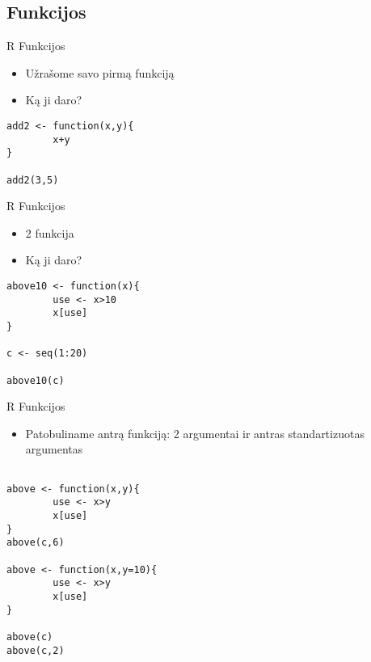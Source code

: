 \documentclass[11pt,xcolor=table]{beamer}
\begin{document}
\subsection{Funkcijos}

\begin{frame}[fragile]{R Funkcijos}
\begin{itemize}
\item Užrašome savo pirmą funkciją
\item Ką ji daro?
\end{itemize}
\begin{lstlisting}
add2 <- function(x,y){
        x+y
}

add2(3,5)
\end{lstlisting}
\end{frame}

\begin{frame}[fragile]{R Funkcijos}
\begin{itemize}
\item 2 funkcija
\item Ką ji daro?
\end{itemize}
\begin{lstlisting}
above10 <- function(x){
        use <- x>10
        x[use]
}

c <- seq(1:20)

above10(c)
\end{lstlisting}
\end{frame}


\begin{frame}[fragile]{R Funkcijos}
\begin{itemize}
\item Patobuliname antrą funkciją: 2 argumentai ir antras standartizuotas argumentas
\end{itemize}
\begin{lstlisting}

above <- function(x,y){
        use <- x>y
        x[use]
}
above(c,6)

above <- function(x,y=10){
        use <- x>y
        x[use]
}

above(c)
above(c,2)
\end{lstlisting}
\end{frame}

\end{document}
